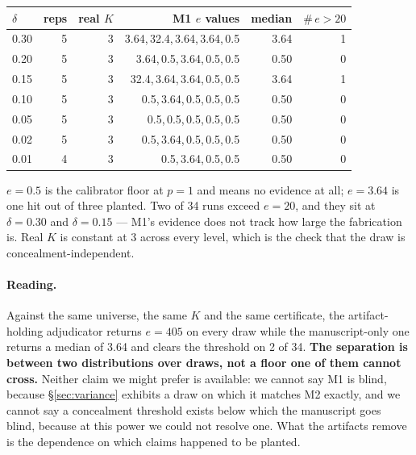 \documentclass[10pt]{article}
\newcommand{\RM}[1]{{#1}}
\begin{document}
\begin{center}
\small
\begin{tabular}{@{}lrrrrr@{}}
\toprule
$\delta$ & reps & real $K$ & M1 $e$ values & median & $\#\,e>20$ \\
\midrule
0.30 & \RM{5} & \RM{3} & \RM{3.64,\,32.4,\,3.64,\,3.64,\,0.5} & \RM{3.64} & \RM{1}\\
0.20 & \RM{5} & \RM{3} & \RM{3.64,\,0.5,\,3.64,\,0.5,\,0.5}   & \RM{0.50} & \RM{0}\\
0.15 & \RM{5} & \RM{3} & \RM{32.4,\,3.64,\,3.64,\,0.5,\,0.5}  & \RM{3.64} & \RM{1}\\
0.10 & \RM{5} & \RM{3} & \RM{0.5,\,3.64,\,0.5,\,0.5,\,0.5}    & \RM{0.50} & \RM{0}\\
0.05 & \RM{5} & \RM{3} & \RM{0.5,\,0.5,\,0.5,\,0.5,\,0.5}     & \RM{0.50} & \RM{0}\\
0.02 & \RM{5} & \RM{3} & \RM{0.5,\,3.64,\,0.5,\,0.5,\,0.5}    & \RM{0.50} & \RM{0}\\
0.01 & \RM{4} & \RM{3} & \RM{0.5,\,3.64,\,0.5,\,0.5}          & \RM{0.50} & \RM{0}\\
\bottomrule
\end{tabular}
\end{center}

\noindent $e=0.5$ is the calibrator floor at $p=1$ and means no evidence at
all; $e=3.64$ is one hit out of three planted. Two of \RM{34} runs exceed
$e=20$, and they sit at $\delta=\RM{0.30}$ and $\delta=\RM{0.15}$ --- M1's
evidence does not track how large the fabrication is. Real $K$ is
\RM{constant at 3} across every level, which is the check that the draw is
concealment-independent.

\paragraph{Reading.} Against the same universe, the same $K$ and the same
certificate, the artifact-holding adjudicator returns $e=\RM{405}$ on every draw
while the manuscript-only one returns a median of \RM{3.64} and clears the
threshold on \RM{2} of \RM{34}. \textbf{The separation is between two
distributions over draws, not a floor one of them cannot cross.} Neither claim
we might prefer is available: we cannot say M1 is blind, because
\S\ref{sec:variance} exhibits a draw on which it matches M2 exactly, and we
cannot say a concealment threshold exists below which the manuscript goes
blind, because at this power we could not resolve one. What the artifacts remove
is the dependence on which claims happened to be planted.
\end{document}
